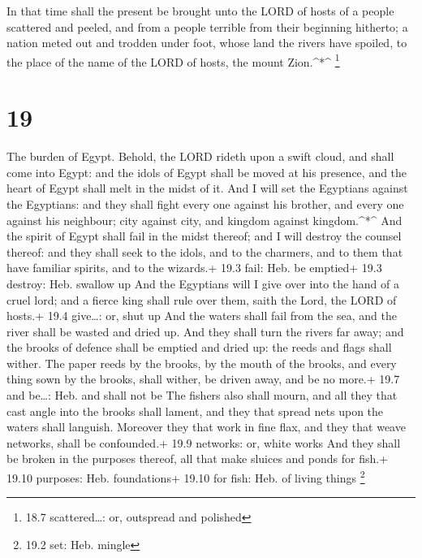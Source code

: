  In that time shall the present be brought unto the LORD of
hosts of a people scattered and peeled, and from a people terrible from
their beginning hitherto; a nation meted out and trodden under foot,
whose land the rivers have spoiled, to the place of the name of the LORD
of hosts, the mount Zion.\^{}*\^{} \footnote{18.7 scattered\ldots: or,
  outspread and polished}

\hypertarget{section-18}{%
\section{19}\label{section-18}}

 The burden of Egypt. Behold, the LORD rideth upon a swift
cloud, and shall come into Egypt: and the idols of Egypt shall be moved
at his presence, and the heart of Egypt shall melt in the midst of it.
 And I will set the Egyptians against the Egyptians: and
they shall fight every one against his brother, and every one against
his neighbour; city against city, and kingdom against kingdom.\^{}*\^{}
 And the spirit of Egypt shall fail in the midst thereof;
and I will destroy the counsel thereof: and they shall seek to the
idols, and to the charmers, and to them that have familiar spirits, and
to the wizards.+ 19.3 fail: Heb. be emptied+ 19.3 destroy: Heb. swallow
up  And the Egyptians will I give over into the hand of a
cruel lord; and a fierce king shall rule over them, saith the Lord, the
LORD of hosts.+ 19.4 give\ldots: or, shut up  And the waters
shall fail from the sea, and the river shall be wasted and dried up.
 And they shall turn the rivers far away; and the brooks of
defence shall be emptied and dried up: the reeds and flags shall wither.
 The paper reeds by the brooks, by the mouth of the brooks,
and every thing sown by the brooks, shall wither, be driven away, and be
no more.+ 19.7 and be\ldots: Heb. and shall not be  The
fishers also shall mourn, and all they that cast angle into the brooks
shall lament, and they that spread nets upon the waters shall languish.
 Moreover they that work in fine flax, and they that weave
networks, shall be confounded.+ 19.9 networks: or, white works
 And they shall be broken in the purposes thereof, all that
make sluices and ponds for fish.+ 19.10 purposes: Heb. foundations+
19.10 for fish: Heb. of living things \footnote{19.2 set: Heb. mingle}

